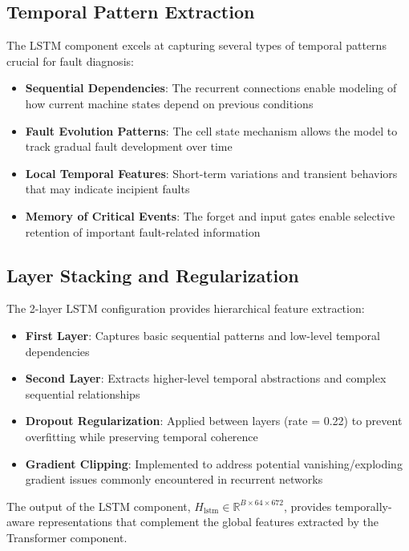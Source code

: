 \subsection{Temporal Pattern Extraction}
\label{subsec:temporal_patterns}

The LSTM component excels at capturing several types of temporal patterns crucial for fault diagnosis:

\begin{itemize}
    \item \textbf{Sequential Dependencies}: The recurrent connections enable modeling of how current machine states depend on previous conditions
    \item \textbf{Fault Evolution Patterns}: The cell state mechanism allows the model to track gradual fault development over time
    \item \textbf{Local Temporal Features}: Short-term variations and transient behaviors that may indicate incipient faults
    \item \textbf{Memory of Critical Events}: The forget and input gates enable selective retention of important fault-related information
\end{itemize}

\subsection{Layer Stacking and Regularization}
\label{subsec:lstm_regularization}

The 2-layer LSTM configuration provides hierarchical feature extraction:

\begin{itemize}
    \item \textbf{First Layer}: Captures basic sequential patterns and low-level temporal dependencies
    \item \textbf{Second Layer}: Extracts higher-level temporal abstractions and complex sequential relationships
    \item \textbf{Dropout Regularization}: Applied between layers (rate = 0.22) to prevent overfitting while preserving temporal coherence
    \item \textbf{Gradient Clipping}: Implemented to address potential vanishing/exploding gradient issues commonly encountered in recurrent networks \citep{pascanu2013difficulty}
\end{itemize}

The output of the LSTM component, $H_{\text{lstm}} \in \mathbb{R}^{B \times 64 \times 672}$, provides temporally-aware representations that complement the global features extracted by the Transformer component.

